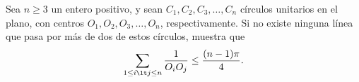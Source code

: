Sea $n\geq 3$ un entero positivo, y sean $C_1,C_2,C_3,\ldots,C_n$ círculos unitarios en el plano, con centros $O_1,O_2,O_3,\ldots,O_n$, respectivamente. Si no existe ninguna línea que pasa por más de dos de estos círculos, muestra que 
 \[ \sum\limits^{}_{1\leq i\lt j\leq n}{\frac{1}{O_iO_j}}\leq{(n-1)\pi\over 4}. \]